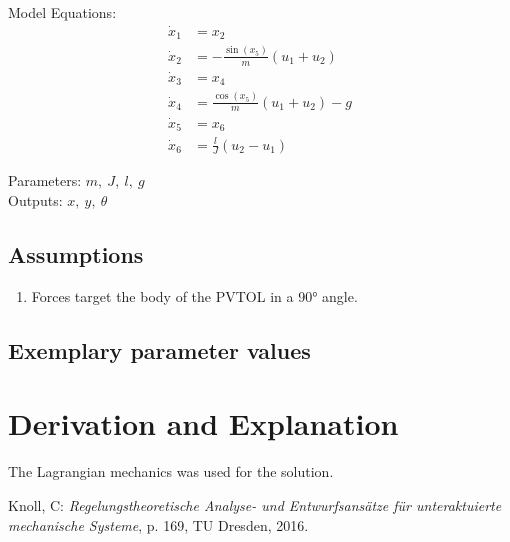 \documentclass[10pt,a4paper]{article}
\begin{document}
	\noindent Model Equations:	
	\begin{subequations}
	\begin{align}
		\dot{x}_1 &= x_2 	\\ 
		\dot{x}_2 &= -\frac{\sin(x_5)}{m} (u_1 + u_2)  \\
		\dot{x}_3 &= x_4 \\
		\dot{x}_4 &= \frac{\cos(x_5)}{m} (u_1 + u_2) - g \\
		\dot{x}_5 &= x_6 \\
		\dot{x}_6 &= \frac{l}{J} (u_2 - u_1)
	\end{align}
	\end{subequations}

	\noindent
	Parameters: $m, ~J, ~l, ~g$ %
	\\
	Outputs:  $x, ~y, ~\theta$%
	
	
	\subsection{Assumptions} %
		\begin{enumerate} %
			\item Forces target the body of the PVTOL in a 90° angle.
		\end{enumerate}
	
	
	\subsection{Exemplary parameter values}
	

	
	\section{Derivation and Explanation} %
	The Lagrangian mechanics was used for the solution.
	
	\begin{thebibliography}{10}		
		Knoll, C: 
		\textit{Regelungstheoretische Analyse- und Entwurfsansätze für unteraktuierte mechanische Systeme}, p. 169, TU Dresden, 2016.
	\end{thebibliography}
\end{document}
